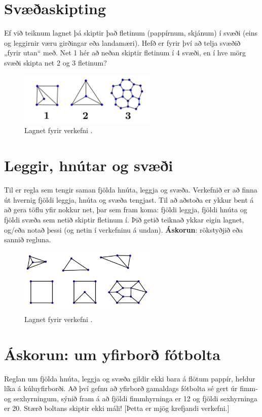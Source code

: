 \documentclass[b5paper,12pt]{book}
\renewcommand*\thesection{\arabic{section}}
\begin{document}
\section{Svæðaskipting}
Ef við teiknum lagnet þá skiptir það fletinum (pappírnum, skjánum) í svæði (eins og leggirnir væru girðingar eða landamæri). Hefð er fyrir því að telja svæðið „fyrir utan“ með. Net 1 hér að neðan skiptir fletinum í 4 svæði, en í hve mörg svæði skipta net 2 og 3 fletinum?

\begin{figure}[h]
  \includegraphics[width=0.6\textwidth, center]{3Svaedi_lagnet.png}
  \caption*{Lagnet fyrir verkefni \thesection{}.}
\end{figure}

\section{Leggir, hnútar og svæði}
\label{sec:eulerchar}
Til er regla sem tengir saman fjölda hnúta, leggja og svæða. Verkefnið er að finna út hvernig fjöldi leggja, hnúta og svæða tengjast. Til að aðstoða er ykkur bent á að gera töflu yfir nokkur net, þar sem fram koma: fjöldi leggja, fjöldi hnúta og fjöldi svæða sem netið skiptir fletinum í. Þið getið teiknað ykkar eigin lagnet, og/eða notað þessi (og netin í verkefninu á undan).
\noindent
\textbf{Áskorun}: rökstyðjið eða sannið regluna.

\begin{figure}[h]
  \includegraphics[width=0.6\textwidth, center]{Nokkur_lagnet.png}
  \caption*{Lagnet fyrir verkefni \thesection{}.}
\end{figure}

\section{Áskorun: um yfirborð fótbolta}
\label{sec:fotbolti}
Reglan um fjölda hnúta, leggja og svæða gildir ekki bara á flötum pappír, heldur líka á kúluyfirborði. Að því gefnu að yfirborð gamaldags fótbolta sé gert úr fimm- og sexhyrningum, sýnið fram á að fjöldi fimmhyrninga er 12 og fjöldi sexhyrninga er 20. Stærð boltans skiptir ekki máli! [Þetta er mjög krefjandi verkefni.]
\end{document}
